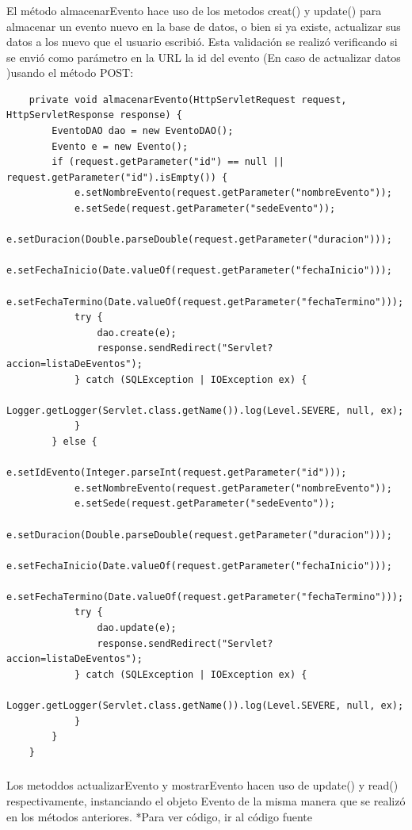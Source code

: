 \documentclass[10pt,a4paper]{article}
\begin{document}
    \subsubsection{\color{colorIPN}{almacenarEvento}}
    El método almacenarEvento hace uso de los metodos creat() y update() para almacenar un evento nuevo en la base de datos, o bien si ya existe, actualizar sus datos a los nuevo que el usuario escribió.
    Esta validación se realizó verificando si se envió como parámetro en la URL la id del evento (En caso de actualizar datos )usando el método POST:
    \begin{lstlisting}
    private void almacenarEvento(HttpServletRequest request, HttpServletResponse response) {
        EventoDAO dao = new EventoDAO();
        Evento e = new Evento();
        if (request.getParameter("id") == null || request.getParameter("id").isEmpty()) {
            e.setNombreEvento(request.getParameter("nombreEvento"));
            e.setSede(request.getParameter("sedeEvento"));
            e.setDuracion(Double.parseDouble(request.getParameter("duracion")));
            e.setFechaInicio(Date.valueOf(request.getParameter("fechaInicio")));
            e.setFechaTermino(Date.valueOf(request.getParameter("fechaTermino")));
            try {
                dao.create(e);
                response.sendRedirect("Servlet?accion=listaDeEventos");
            } catch (SQLException | IOException ex) {
                Logger.getLogger(Servlet.class.getName()).log(Level.SEVERE, null, ex);
            }
        } else {
            e.setIdEvento(Integer.parseInt(request.getParameter("id")));
            e.setNombreEvento(request.getParameter("nombreEvento"));
            e.setSede(request.getParameter("sedeEvento"));
            e.setDuracion(Double.parseDouble(request.getParameter("duracion")));
            e.setFechaInicio(Date.valueOf(request.getParameter("fechaInicio")));
            e.setFechaTermino(Date.valueOf(request.getParameter("fechaTermino")));
            try {
                dao.update(e);
                response.sendRedirect("Servlet?accion=listaDeEventos");
            } catch (SQLException | IOException ex) {
                Logger.getLogger(Servlet.class.getName()).log(Level.SEVERE, null, ex);
            }
        }
    }
    \end{lstlisting}
    \subsubsection{\color{colorIPN}{actualizat y mostrar Evento}}
    Los metoddos actualizarEvento y mostrarEvento hacen uso de update() y read() respectivamente, instanciando el objeto Evento de la misma manera que se realizó en los métodos anteriores. 
    *Para ver código, ir al código fuente
    \begin{lstlisting}
    \end{lstlisting}
\end{document}
